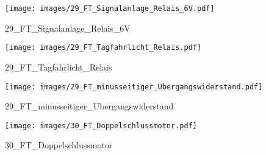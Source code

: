 %
%
\begin{figure}[!hb]%
    \centering
  \texttt{[image: images/29\_FT\_Signalanlage\_Relais\_6V.pdf]}%
  \caption{29_FT_Signalanlage_Relais_6V}%
\end{figure}

%
%
\begin{figure}[!hb]%
    \centering
  \texttt{[image: images/29\_FT\_Tagfahrlicht\_Relais.pdf]}%
  \caption{29_FT_Tagfahrlicht_Relais}%
\end{figure}

%
%
\begin{figure}[!hb]%
    \centering
  \texttt{[image: images/29\_FT\_minusseitiger\_Ubergangswiderstand.pdf]}%
  \caption{29_FT_minusseitiger_Ubergangswiderstand}%
\end{figure}

%
%
\begin{figure}[!hb]%
    \centering
  \texttt{[image: images/30\_FT\_Doppelschlussmotor.pdf]}%
  \caption{30_FT_Doppelschlussmotor}%
\end{figure}

